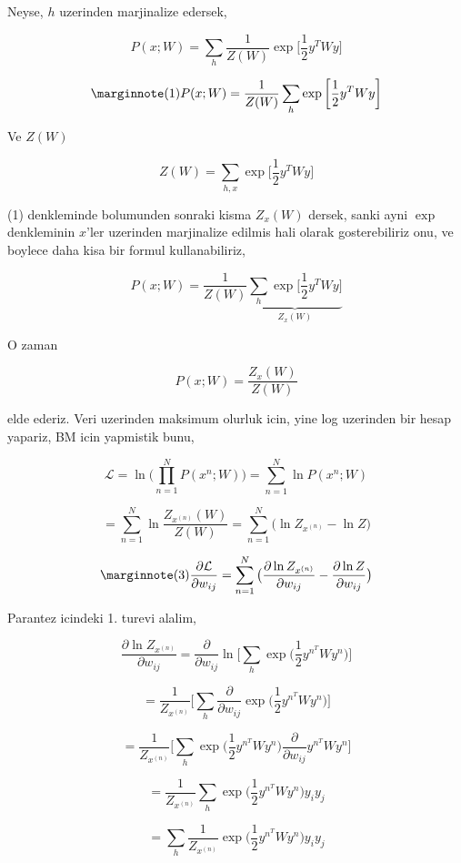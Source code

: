 \documentclass[12pt,fleqn]{article}\usepackage{../common}
\begin{document}
Neyse, $h$ uzerinden marjinalize edersek,

$$ P(x;W) = \sum_h \frac{1}{Z(W)} \exp 
\bigg[ 
\frac{1}{2} y^T W y
\bigg]
$$


$$  
\mlabel{1}
P(x;W) = \frac{1}{Z(W)}  \sum_h \exp 
\bigg[ 
\frac{1}{2} y^T W y
\bigg]
$$


Ve $Z(W)$ 

$$ Z(W) = \sum_{h,x} \exp 
\bigg[ 
\frac{1}{2} y^T W y
\bigg]
$$

(1) denkleminde bolumunden sonraki kisma $Z_x(W)$ dersek, sanki ayni $\exp$
denkleminin $x$'ler uzerinden marjinalize edilmis hali olarak
gosterebiliriz onu, ve boylece daha kisa bir formul kullanabiliriz,

$$  
P(x;W) = \frac{1}{Z(W)}  
\underbrace{
\sum_h \exp 
\bigg[ 
\frac{1}{2} y^T W y
\bigg]
}_{Z_x(W)}
$$

O zaman 

$$  
P(x;W) = \frac{Z_x(W)}{Z(W)} 
$$

elde ederiz. Veri uzerinden maksimum olurluk icin, yine log uzerinden bir
hesap yapariz, BM icin yapmistik bunu,

$$  
\mathcal{L} = 
\ln \big( \prod_{n=1}^{N} P(x^{n};W) \big) = 
\sum_{n=1}^{N} \ln P(x^{n};W) 
$$

$$ 
= \sum_{n=1}^{N} \ln \frac{Z_{x^{(n)}}(W)}{Z(W)}  
= \sum_{n=1}^{N}  \big(\ln Z_{x^{(n)}} - \ln Z \big) 
$$

$$ 
\mlabel{3}
\frac{\partial \mathcal{L} }{\partial w_{ij}} = 
\sum_{n=1}^{N}  \big( \frac{\partial \ln Z_{x^{(n)}} }{\partial w_{ij}}
- \frac{\partial \ln Z }{\partial w_{ij}} \big)
$$

Parantez icindeki 1. turevi alalim,

$$ 
\frac{\partial \ln Z_{x^{(n)}} }{\partial w_{ij}} = 
\frac{\partial }{\partial w_{ij}}  
\ln \bigg[ 
\sum_h \exp \big( \frac{1}{2} y^{n^T} W y^n \big) 
\bigg]
$$

$$ 
= \frac{1}{Z_{x^{(n)}}}  \bigg[ \sum_h \frac{\partial }{\partial w_{ij}} \exp \big( \frac{1}{2} y^{n^T} W y^n  \big) \bigg]
$$

$$ 
= \frac{1}{Z_{x^{(n)}}}  
\bigg[ 
\sum_h  \exp \big( \frac{1}{2} y^{n^T} W y^n  \big) 
\frac{\partial }{\partial w_{ij}} y^{n^T} W y^n 
\bigg]
$$

$$ 
= \frac{1}{Z_{x^{(n)}}}  \sum_h  \exp \big( \frac{1}{2} y^{n^T} W y^n  \big) y_iy_j
$$


$$ 
= \sum_h  \frac{1}{Z_{x^{(n)}}}  \exp \big( \frac{1}{2} y^{n^T} W y^n  \big) y_iy_j
$$
\end{document}
